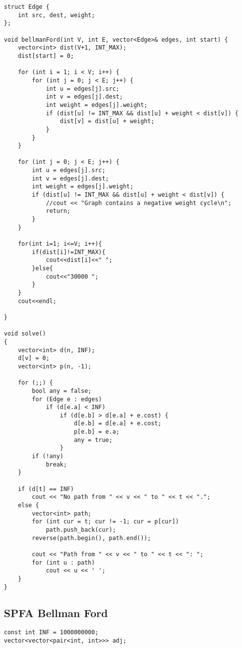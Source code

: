 \documentclass[10pt]{article}
\begin{document}
\begin{multicols*}{2}
\begin{lstlisting}[style=compactcpp]
struct Edge {
    int src, dest, weight;
};

void bellmanFord(int V, int E, vector<Edge>& edges, int start) {
    vector<int> dist(V+1, INT_MAX);
    dist[start] = 0;

    for (int i = 1; i < V; i++) {
        for (int j = 0; j < E; j++) {
            int u = edges[j].src;
            int v = edges[j].dest;
            int weight = edges[j].weight;
            if (dist[u] != INT_MAX && dist[u] + weight < dist[v]) {
                dist[v] = dist[u] + weight;
            }
        }
    }

    for (int j = 0; j < E; j++) {
        int u = edges[j].src;
        int v = edges[j].dest;
        int weight = edges[j].weight;
        if (dist[u] != INT_MAX && dist[u] + weight < dist[v]) {
            //cout << "Graph contains a negative weight cycle\n";
            return;
        }
    }

    for(int i=1; i<=V; i++){
        if(dist[i]!=INT_MAX){
            cout<<dist[i]<<" ";
        }else{
            cout<<"30000 ";
        }
    }
    cout<<endl;

}

void solve()
{
    vector<int> d(n, INF);
    d[v] = 0;
    vector<int> p(n, -1);

    for (;;) {
        bool any = false;
        for (Edge e : edges)
            if (d[e.a] < INF)
                if (d[e.b] > d[e.a] + e.cost) {
                    d[e.b] = d[e.a] + e.cost;
                    p[e.b] = e.a;
                    any = true;
                }
        if (!any)
            break;
    }

    if (d[t] == INF)
        cout << "No path from " << v << " to " << t << ".";
    else {
        vector<int> path;
        for (int cur = t; cur != -1; cur = p[cur])
            path.push_back(cur);
        reverse(path.begin(), path.end());

        cout << "Path from " << v << " to " << t << ": ";
        for (int u : path)
            cout << u << ' ';
    }
}
\end{lstlisting}

\subsection{SPFA Bellman Ford}
\begin{lstlisting}[style=compactcpp]
const int INF = 1000000000;
vector<vector<pair<int, int>>> adj;


\end{lstlisting}
\end{multicols*}
\end{document}
